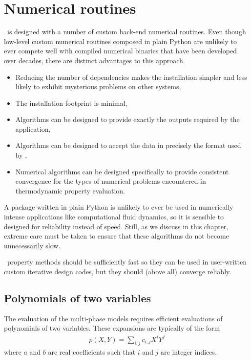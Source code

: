 \chapter{Numerical routines}\label{ch:num}

\PM\ is designed with a number of custom back-end numerical routines.  Even though low-level custom numerical routines composed in plain Python are unlikely to ever compete well with compiled numerical binaries that have been developed over decades, there are distinct advantages to this approach.
\begin{itemize}
\item Reducing the number of dependencies makes the installation simpler and less likely to exhibit mysterious problems on other systems,
\item The installation footprint is minimal,
\item Algorithms can be designed to provide exactly the outputs required by the application,
\item Algorithms can be designed to accept the data in precisely the format used by \PM,
\item Numerical algorithms can be designed specifically to provide consistent convergence for the types of numerical problems encountered in thermodynamic property evaluation.
\end{itemize}

A package written in plain Python is unlikely to ever be used in numerically intense applications like computational fluid dynamics, so it is sensible to designed for reliability instead of speed.  Still, as we discuss in this chapter, extreme care must be taken to ensure that these algorithms do not become unnecessarily slow.  

\PM\ property methods should be sufficiently fast so they can be used in user-written custom iterative design codes, but they should (above all) converge reliably.

%
%
\section{Polynomials of two variables}\label{sec:num:poly2}
The evaluation of the multi-phase models requires efficient evaluations of polynomials of two variables.  These expansions are typically of the form
\begin{align}
p(X,Y) = \sum_{i,j} c_{i,j} X^i Y^j\label{eqn:general}
\end{align}
where $a$ and $b$ are real coefficients such that $i$ and $j$ are integer indices. 

